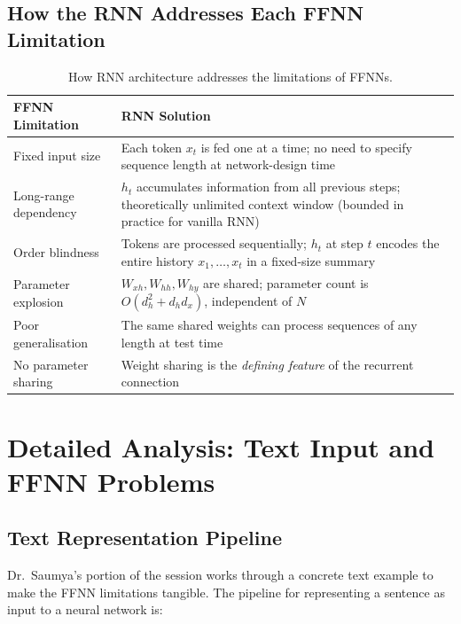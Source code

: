 \documentclass[12pt,a4paper]{article}
\newcommand{\Whh}{W_{hh}}
\newcommand{\Wxh}{W_{xh}}
\newcommand{\Why}{W_{hy}}
\begin{document}
\subsection{How the RNN Addresses Each FFNN Limitation}

\begin{table}[ht]
  \centering
  \caption{How RNN architecture addresses the limitations of FFNNs.}
  \label{tab:rnn_solutions}
  \begin{tabularx}{\linewidth}{lX}
    \toprule
    \textbf{FFNN Limitation} & \textbf{RNN Solution} \\
    \midrule
    Fixed input size &
      Each token $x_t$ is fed one at a time; no need to specify sequence
      length at network-design time \\
    Long-range dependency &
      $h_t$ accumulates information from all previous steps; theoretically
      unlimited context window (bounded in practice for vanilla RNN) \\
    Order blindness &
      Tokens are processed sequentially; $h_t$ at step $t$ encodes the
      entire history $x_1, \ldots, x_t$ in a fixed-size summary \\
    Parameter explosion &
      $\Wxh, \Whh, \Why$ are shared; parameter count is $O(d_h^2 + d_h d_x)$,
      independent of $N$ \\
    Poor generalisation &
      The same shared weights can process sequences of any length at test time \\
    No parameter sharing &
      Weight sharing is the \emph{defining feature} of the recurrent connection \\
    \bottomrule
  \end{tabularx}
\end{table}

\section{Detailed Analysis: Text Input and FFNN Problems}
\label{sec:text_input}

\subsection{Text Representation Pipeline}
\label{subsec:text_pipeline}

Dr.\ Saumya's portion of the session works through a concrete text example
to make the FFNN limitations tangible.  The pipeline for representing a
sentence as input to a neural network is:
\end{document}

